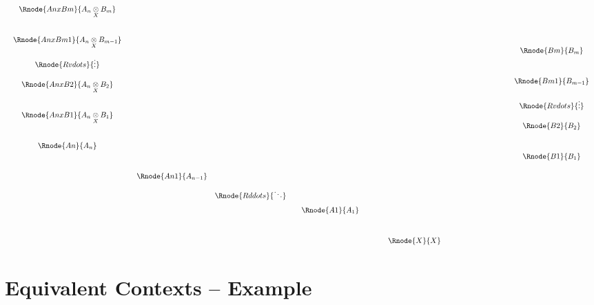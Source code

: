 \documentclass[10pt,a4paper]{scrartcl}
\begin{document}
\begin{displaymath}
\begin{array}{cccp{2cm}c}
\begin{array} {c}
\Rnode{AnxBm}{\crossx{A_n}{B_m}{X}}      \\ [1.0cm]
\Rnode{AnxBm1}{\crossx{A_n}{B_{m-1}}{X}} \\ [0.5cm]
\raisebox{1.0cm}{$\Rnode{Rvdots}{\vdots}$}\\ [-0.5cm]
\Rnode{AnxB2}{\crossx{A_n}{B_2}{X}}       \\ [1.0cm]
\Rnode{AnxB1}{\crossx{A_n}{B_1}{X}}\\ [1.0cm]
\Rnode{An}{A_n}                    \\ [1.0cm]
         
\end{array} 
& & & &
\begin{array}{c}
                                    \\ [1.0cm]
              \Rnode{Bm}{B_m}       \\ [1.0cm]
              \Rnode{Bm1}{B_{m-1}}  \\ [0.5cm]
							\Rnode{Rvdots}{\vdots}\\ [0.5cm]
              \Rnode{B2}{B_2}       \\ [1.0cm]
              \Rnode{B1}{B_1}          
\end{array} \\
&\begin{array}{ccccc}
\Rnode{An1}{A_{n-1}}  \\ [0.25cm]
     &\Rnode{Rddots}{\ddots} \\ [0.25cm]
              &&&\Rnode{A1}{A_1}  \\ [1.0cm]
                 &&&&\hspace{1cm}\Rnode{X}{X} \\
\end{array} & & &
\end{array}
\end{displaymath}
 


\section{Equivalent Contexts -- Example}
\end{document}
